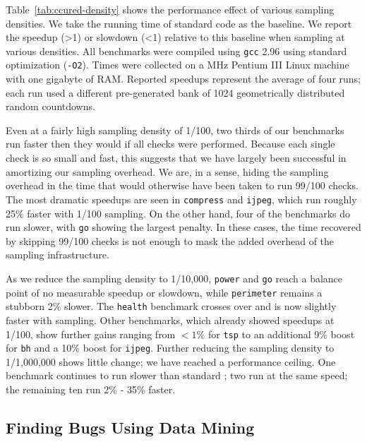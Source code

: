 Table~\ref{tab:ccured-density} shows the performance effect of various
sampling densities.  We take the running time of standard \ccured code
as the baseline.  We report the speedup (>1) or slowdown (<1) relative
to this baseline when sampling at various densities.  All benchmarks
were compiled using \texttt{gcc} 2.96 using standard optimization
(\texttt{-O2}).  Times were collected on a \unknown MHz Pentium III
Linux machine with one gigabyte of RAM.  Reported speedups represent
the average of four runs; each run used a different pre-generated bank
of 1024 geometrically distributed random countdowns.

Even at a fairly high sampling density of 1/100, two thirds of our
benchmarks run faster then they would if all checks were performed.
Because each single check is so small and fast, this suggests that we
have largely been successful in amortizing our sampling overhead.  We
are, in a sense, hiding the sampling overhead in the time that would
otherwise have been taken to run 99/100 checks.  The most dramatic
speedups are seen in \texttt{compress} and \texttt{ijpeg}, which run
roughly 25\% faster with 1/100 sampling.  On the other hand, four of
the benchmarks do run slower, with \texttt{go} showing the largest
penalty.  In these cases, the time recovered by skipping 99/100 checks
is not enough to mask the added overhead of the sampling
infrastructure.

As we reduce the sampling density to 1/10,000, \texttt{power} and
\texttt{go} reach a balance point of no measurable speedup or
slowdown, while \texttt{perimeter} remains a stubborn 2\% slower.  The
\texttt{health} benchmark crosses over and is now slightly faster with
sampling.  Other benchmarks, which already showed speedups at 1/100,
show further gains ranging from $<1\%$ for \texttt{tsp} to an
additional 9\% boost for \texttt{bh} and a 10\% boost for
\texttt{ijpeg}.  Further reducing the sampling density to 1/1,000,000
shows little change; we have reached a performance ceiling.  One
benchmark continues to run slower than standard \ccured; two run at
the same speed; the remaining ten run 2\% - 35\% faster.



\subsection{Finding Bugs Using Data Mining}

